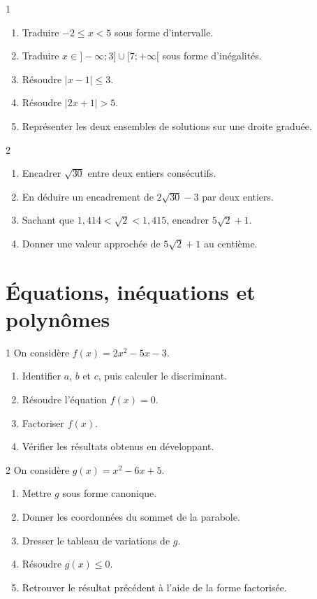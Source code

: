 \begin{exo}{1}
\begin{enumerate}
  \item Traduire $-2\leq x<5$ sous forme d'intervalle.
  \item Traduire $x\in]-\infty;3]\cup[7;+\infty[$ sous forme d'inégalités.
  \item Résoudre $|x-1|\leq3$.
  \item Résoudre $|2x+1|>5$.
  \item Représenter les deux ensembles de solutions sur une droite graduée.
\end{enumerate}
\end{exo}

\begin{exo}{2}
\begin{enumerate}
  \item Encadrer $\sqrt{30}$ entre deux entiers consécutifs.
  \item En déduire un encadrement de $2\sqrt{30}-3$ par deux entiers.
  \item Sachant que $1{,}414<\sqrt2<1{,}415$, encadrer $5\sqrt2+1$.
  \item Donner une valeur approchée de $5\sqrt2+1$ au centième.
\end{enumerate}
\end{exo}

\section{Équations, inéquations et polynômes}

\begin{exo}{1}
On considère $f(x)=2x^2-5x-3$.
\begin{enumerate}
  \item Identifier $a$, $b$ et $c$, puis calculer le discriminant.
  \item Résoudre l'équation $f(x)=0$.
  \item Factoriser $f(x)$.
  \item Vérifier les résultats obtenus en développant.
\end{enumerate}
\end{exo}

\begin{exo}{2}
On considère $g(x)=x^2-6x+5$.
\begin{enumerate}
  \item Mettre $g$ sous forme canonique.
  \item Donner les coordonnées du sommet de la parabole.
  \item Dresser le tableau de variations de $g$.
  \item Résoudre $g(x)\leq0$.
  \item Retrouver le résultat précédent à l'aide de la forme factorisée.
\end{enumerate}
\end{exo}


